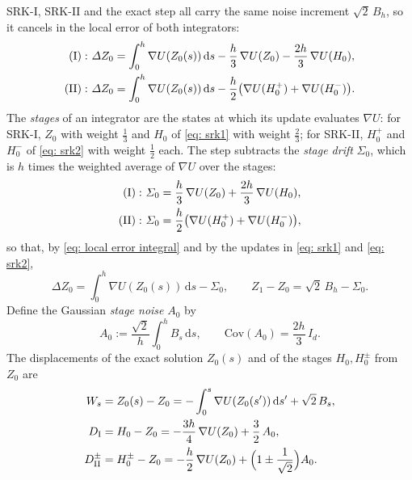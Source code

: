 \documentclass[namedate,webpdf,imanum]{ima-authoring-template}
\newcommand{\D}{\mathrm{d}}
\theoremstyle{thmstyletwo}
\numberwithin{equation}{section}
\begin{document}
SRK-I, SRK-II and the exact step all carry the same noise increment $\sqrt2\, B_h$, so it cancels in the local error of both integrators:
\begin{align}
	\mathrm{(I):~}
    \Delta Z_0 & = \int_0^h \nabla U(Z_0(s))\,\D s - \frac h3\, \nabla U(Z_0) - \frac{2h}3\, \nabla U(H_0) , \notag \\
    \mathrm{(II):~}
    \Delta Z_0 & = \int_0^h \nabla U(Z_0(s))\,\D s - \frac h2 \bigl( \nabla U(H_0^{+}) + \nabla U(H_0^{-}) \bigr) .
    \label{eq: local error integral}
\end{align}
The \emph{stages} of an integrator are the states at which its update evaluates $\nabla U$: for SRK-I, $Z_0$ with weight $\frac13$ and $H_0$ of \eqref{eq: srk1} with weight $\frac23$; for SRK-II, $H_0^{+}$ and $H_0^{-}$ of \eqref{eq: srk2} with weight $\frac12$ each. The step subtracts the \emph{stage drift} $\Sigma_0$, which is $h$ times the weighted average of $\nabla U$ over the stages:
\begin{align}
    \mathrm{(I):~} \Sigma_0 & = \frac h3\, \nabla U(Z_0) + \frac{2h}{3}\, \nabla U(H_0) , \notag \\
    \mathrm{(II):~} \Sigma_0 & = \frac h2 \bigl( \nabla U(H_0^{+}) + \nabla U(H_0^{-}) \bigr) ,
    \label{eq: stage drift}
\end{align}
so that, by \eqref{eq: local error integral} and by the updates in \eqref{eq: srk1} and \eqref{eq: srk2},
\begin{equation}
    \Delta Z_0 = \int_0^h \nabla U(Z_0(s))\,\D s - \Sigma_0 , \qquad Z_1 - Z_0 = \sqrt2\, B_h - \Sigma_0 .
    \label{eq: step in stage drift}
\end{equation}
Define the Gaussian \emph{stage noise} $A_0$ by
\begin{equation}
    A_0 := \frac{\sqrt2}{h} \int_0^h B_s\,\D s , \qquad \mathrm{Cov}(A_0) = \frac{2h}{3}\, I_d .
    \label{eq: stage noise}
\end{equation}
The displacements of the exact solution $Z_0(s)$ and of the stages $H_0,H_0^{\pm}$ from $Z_0$ are
\begin{equation}
\begin{aligned}
    W_s &= Z_0(s) - Z_0 = - \int_0^s \nabla U(Z_0(s'))\,\D s' + \sqrt2\, B_s , \\
    D_{\mathrm I} &= H_0 - Z_0 = - \frac{3h}{4}\, \nabla U(Z_0) + \frac32\, A_0 , \\
    D_{\mathrm{II}}^{\pm} &= H_0^{\pm} - Z_0 = - \frac h2\, \nabla U(Z_0) + \Bigl( 1 \pm \frac{1}{\sqrt2} \Bigr) A_0 .
\end{aligned}
\label{eq: displacements}
\end{equation}
\end{document}
